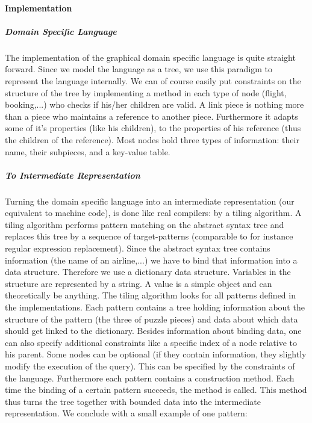 \paragraph{Implementation}
\subparagraph{Domain Specific Language}
The implementation of the graphical domain specific language is quite straight
forward. Since we model the language as a tree, we use this paradigm to
represent the language internally. We can of course easily put constraints on
the structure of the tree by implementing a method in each type of node
(flight, booking,...) who checks if his/her children are valid. A link piece is
nothing more than a piece who maintains a reference to another piece.
Furthermore it adapts some of it's properties (like his children), to the
properties of his reference (thus the children of the reference). Most nodes
hold three types of information: their name, their subpieces, and a key-value
table.
\subparagraph{To Intermediate Representation}
Turning the domain specific language into an intermediate representation (our
equivalent to machine code), is done like real compilers: by a tiling
algorithm. A tiling algorithm performs pattern matching on the abstract syntax
tree and replaces this tree by a sequence of target-patterns (comparable to
for instance regular expression replacement). Since the abstract syntax tree
contains information (the name of an airline,...) we have to bind that
information into a data structure. Therefore we use a dictionary data
structure. Variables in the structure are represented by a string. A value is a
simple object and can theoretically be anything. The tiling algorithm looks for
all patterns defined in the implementations. Each pattern contains a tree
holding information about the structure of the pattern (the three of puzzle
pieces) and data about which data should get linked to the dictionary. Besides
information about binding data, one can also specify additional constraints
like a specific index of a node relative to his parent. Some nodes can be
optional (if they contain information, they slightly modify the execution of
the query). This can be specified by the constraints of the language.
Furthermore each pattern contains a construction method. Each time the binding
of a certain pattern succeeds, the method is called. This method thus turns the
tree together with bounded data into the intermediate representation.
We conclude with a small example of one pattern:
